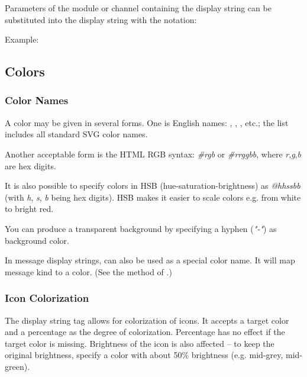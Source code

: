 Parameters of the module or channel containing the
display string can be substituted into the display string
with the  notation:

Example:


\subsection{Colors}
\label{sec:ch-graphics:colors}

\subsubsection{Color Names}

A color may be given in several forms. One is English names: ,
, , etc.; the list includes all standard SVG
color names.

Another acceptable form is the HTML RGB syntax: \textit{\#rgb} or
\textit{\#rrggbb}, where \textit{r},\textit{g},\textit{b} are hex digits.

It is also possible to specify colors in HSB (hue-saturation-brightness) as
\textit{@hhssbb} (with \textit{h}, \textit{s}, \textit{b} being hex digits).
HSB makes it easier to scale colors e.g. from white to bright red.

You can produce a transparent background by specifying a hyphen (\textit{"-"})
as background color.

In message display strings,  can also be used as a special color
name. It will map message kind to a color. (See the 
method of .)

\subsubsection{Icon Colorization}

The  display string tag allows for colorization of icons.
It accepts a target color and a percentage as the degree of colorization.
Percentage has no effect if the target color is missing.
Brightness of the icon is also affected -- to keep the original brightness,
specify a color with about 50\% brightness (e.g.  mid-grey,
 mid-green).

